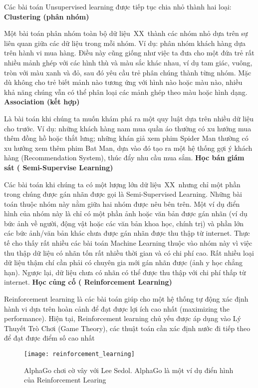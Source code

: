 Các bài toán Unsupervised learning được tiếp tục chia nhỏ thành hai loại:
\newline
\newline
\textbf{Clustering (phân nhóm)}
\par
Một bài toán phân nhóm toàn bộ dữ liệu XX thành các nhóm nhỏ dựa trên sự liên quan giữa các dữ liệu trong mỗi nhóm. Ví dụ: phân nhóm khách hàng dựa trên hành vi mua hàng. Điều này cũng giống như việc ta đưa cho một đứa trẻ rất nhiều mảnh ghép với các hình thù và màu sắc khác nhau, ví dụ tam giác, vuông, tròn với màu xanh và đỏ, sau đó yêu cầu trẻ phân chúng thành từng nhóm. Mặc dù không cho trẻ biết mảnh nào tương ứng với hình nào hoặc màu nào, nhiều khả năng chúng vẫn có thể phân loại các mảnh ghép theo màu hoặc hình dạng.
\newline
\newline
\textbf{Association (kết hợp)}
\par
Là bài toán khi chúng ta muốn khám phá ra một quy luật dựa trên nhiều dữ liệu cho trước. Ví dụ: những khách hàng nam mua quần áo thường có xu hướng mua thêm đồng hồ hoặc thắt lưng; những khán giả xem phim Spider Man thường có xu hướng xem thêm phim Bat Man, dựa vào đó tạo ra một hệ thống gợi ý khách hàng (Recommendation System), thúc đẩy nhu cầu mua sắm.
\newline 
\newline  
\textbf{Học bán giám sát ( Semi-Supervise Learning)}
\par
Các bài toán khi chúng ta có một lượng lớn dữ liệu XX nhưng chỉ một phần trong chúng được gán nhãn được gọi là Semi-Supervised Learning. Những bài toán thuộc nhóm này nằm giữa hai nhóm được nêu bên trên.
Một ví dụ điển hình của nhóm này là chỉ có một phần ảnh hoặc văn bản được gán nhãn (ví dụ bức ảnh về người, động vật hoặc các văn bản khoa học, chính trị) và phần lớn các bức ảnh/văn bản khác chưa được gán nhãn được thu thập từ internet. Thực tế cho thấy rất nhiều các bài toán Machine Learning thuộc vào nhóm này vì việc thu thập dữ liệu có nhãn tốn rất nhiều thời gian và có chi phí cao. Rất nhiều loại dữ liệu thậm chí cần phải có chuyên gia mới gán nhãn được (ảnh y học chẳng hạn). Ngược lại, dữ liệu chưa có nhãn có thể được thu thập với chi phí thấp từ internet.
\newline
\newline   
\textbf{Học củng cố ( Reinforcement Learning)}
\par
Reinforcement learning là các bài toán giúp cho một hệ thống tự động xác định hành vi dựa trên hoàn cảnh để đạt được lợi ích cao nhất (maximizing the performance). Hiện tại, Reinforcement learning chủ yếu được áp dụng vào Lý Thuyết Trò Chơi (Game Theory), các thuật toán cần xác định nước đi tiếp theo để đạt được điểm số cao nhất
\begin{figure}[!htbp]
    \centering
    \texttt{[image: reinforcement\_learning]}
    \caption{AlphaGo chơi cờ vây với Lee Sedol. AlphaGo là một ví dụ điển hình của Reinforcement Learing}
    \label{fig:x cubed graph}
\end{figure}
\FloatBarrier